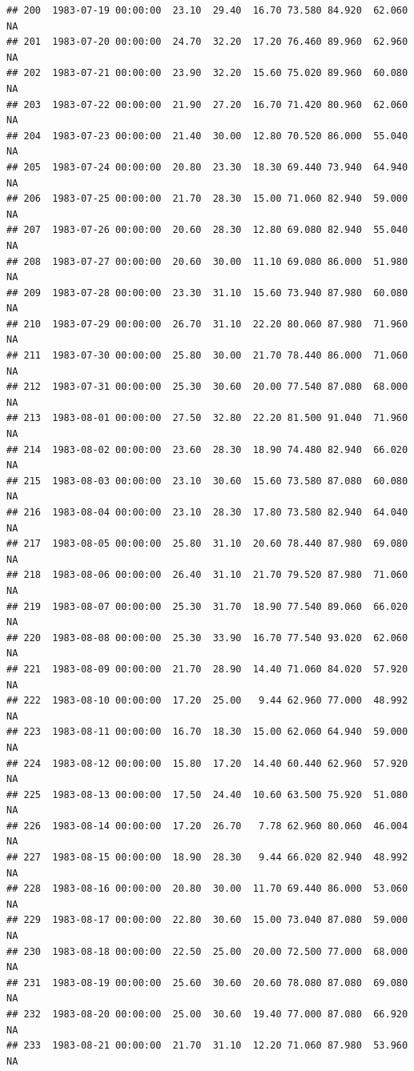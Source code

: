 \documentclass{article}\usepackage{graphicx, color}
\makeatletter
\newenvironment{kframe}{%
 \def\at@end@of@kframe{}%
 \ifinner\ifhmode%
  \def\at@end@of@kframe{\end{minipage}}%
  \begin{minipage}{\columnwidth}%
 \fi\fi%
 \def\FrameCommand##1{\hskip\@totalleftmargin \hskip-\fboxsep
 \colorbox{shadecolor}{##1}\hskip-\fboxsep
     \hskip-\linewidth \hskip-\@totalleftmargin \hskip\columnwidth}%
 \MakeFramed {\advance\hsize-\width
   \@totalleftmargin\z@ \linewidth\hsize
   \@setminipage}}%
 {\par\unskip\endMakeFramed%
 \at@end@of@kframe}
\newenvironment{knitrout}{}{} %
\makeatother
\begin{document}
\begin{knitrout}
\begin{kframe}
\begin{verbatim}
## 200  1983-07-19 00:00:00  23.10  29.40  16.70 73.580 84.920  62.060     NA
## 201  1983-07-20 00:00:00  24.70  32.20  17.20 76.460 89.960  62.960     NA
## 202  1983-07-21 00:00:00  23.90  32.20  15.60 75.020 89.960  60.080     NA
## 203  1983-07-22 00:00:00  21.90  27.20  16.70 71.420 80.960  62.060     NA
## 204  1983-07-23 00:00:00  21.40  30.00  12.80 70.520 86.000  55.040     NA
## 205  1983-07-24 00:00:00  20.80  23.30  18.30 69.440 73.940  64.940     NA
## 206  1983-07-25 00:00:00  21.70  28.30  15.00 71.060 82.940  59.000     NA
## 207  1983-07-26 00:00:00  20.60  28.30  12.80 69.080 82.940  55.040     NA
## 208  1983-07-27 00:00:00  20.60  30.00  11.10 69.080 86.000  51.980     NA
## 209  1983-07-28 00:00:00  23.30  31.10  15.60 73.940 87.980  60.080     NA
## 210  1983-07-29 00:00:00  26.70  31.10  22.20 80.060 87.980  71.960     NA
## 211  1983-07-30 00:00:00  25.80  30.00  21.70 78.440 86.000  71.060     NA
## 212  1983-07-31 00:00:00  25.30  30.60  20.00 77.540 87.080  68.000     NA
## 213  1983-08-01 00:00:00  27.50  32.80  22.20 81.500 91.040  71.960     NA
## 214  1983-08-02 00:00:00  23.60  28.30  18.90 74.480 82.940  66.020     NA
## 215  1983-08-03 00:00:00  23.10  30.60  15.60 73.580 87.080  60.080     NA
## 216  1983-08-04 00:00:00  23.10  28.30  17.80 73.580 82.940  64.040     NA
## 217  1983-08-05 00:00:00  25.80  31.10  20.60 78.440 87.980  69.080     NA
## 218  1983-08-06 00:00:00  26.40  31.10  21.70 79.520 87.980  71.060     NA
## 219  1983-08-07 00:00:00  25.30  31.70  18.90 77.540 89.060  66.020     NA
## 220  1983-08-08 00:00:00  25.30  33.90  16.70 77.540 93.020  62.060     NA
## 221  1983-08-09 00:00:00  21.70  28.90  14.40 71.060 84.020  57.920     NA
## 222  1983-08-10 00:00:00  17.20  25.00   9.44 62.960 77.000  48.992     NA
## 223  1983-08-11 00:00:00  16.70  18.30  15.00 62.060 64.940  59.000     NA
## 224  1983-08-12 00:00:00  15.80  17.20  14.40 60.440 62.960  57.920     NA
## 225  1983-08-13 00:00:00  17.50  24.40  10.60 63.500 75.920  51.080     NA
## 226  1983-08-14 00:00:00  17.20  26.70   7.78 62.960 80.060  46.004     NA
## 227  1983-08-15 00:00:00  18.90  28.30   9.44 66.020 82.940  48.992     NA
## 228  1983-08-16 00:00:00  20.80  30.00  11.70 69.440 86.000  53.060     NA
## 229  1983-08-17 00:00:00  22.80  30.60  15.00 73.040 87.080  59.000     NA
## 230  1983-08-18 00:00:00  22.50  25.00  20.00 72.500 77.000  68.000     NA
## 231  1983-08-19 00:00:00  25.60  30.60  20.60 78.080 87.080  69.080     NA
## 232  1983-08-20 00:00:00  25.00  30.60  19.40 77.000 87.080  66.920     NA
## 233  1983-08-21 00:00:00  21.70  31.10  12.20 71.060 87.980  53.960     NA

\end{verbatim}
\end{kframe}
\end{knitrout}
\end{document}
